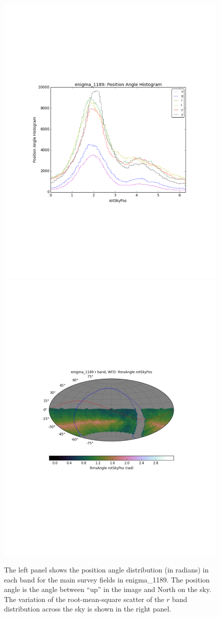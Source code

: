 \documentclass[manuscript]{article}
\begin{document}
\begin{figure}[b!]
\vskip -1.1in
\includegraphics[angle=0,width=0.49\hsize,clip]{enigma1189_rotator.pdf}
\includegraphics[angle=0,width=0.49\hsize,clip]{enigma1189_rotator2.pdf}
\vskip -1.3in
\caption{The left panel shows the position angle distribution (in radians)  in each band for the
main survey fields in enigma\_1189. The position angle is the angle between ``up'' in the image 
and North on the sky. The variation of the root-mean-square scatter of the $r$ band 
distribution across the sky is shown in the right panel.} 
\label{fig:rotator}
\end{figure}
\end{document}
